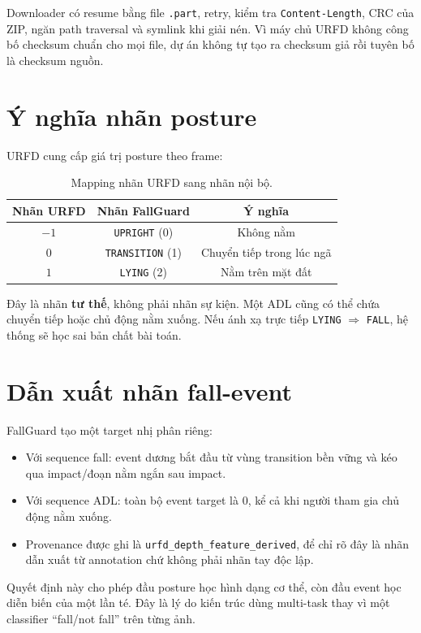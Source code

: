 \documentclass[12pt,a4paper,oneside]{report}
\newcommand{\code}[1]{\texttt{#1}}
\begin{document}
Downloader có resume bằng file \code{.part}, retry, kiểm tra
\code{Content-Length}, CRC của ZIP, ngăn path traversal và symlink khi giải nén.
Vì máy chủ URFD không công bố checksum chuẩn cho mọi file, dự án không tự tạo
ra checksum giả rồi tuyên bố là checksum nguồn.

\section{Ý nghĩa nhãn posture}

URFD cung cấp giá trị posture theo frame:

\begin{table}[H]
\centering
\caption{Mapping nhãn URFD sang nhãn nội bộ.}
\begin{tabular}{ccc}
\toprule
Nhãn URFD & Nhãn FallGuard & Ý nghĩa \\
\midrule
$-1$ & \code{UPRIGHT} (0) & Không nằm \\
$0$ & \code{TRANSITION} (1) & Chuyển tiếp trong lúc ngã \\
$1$ & \code{LYING} (2) & Nằm trên mặt đất \\
\bottomrule
\end{tabular}
\end{table}

Đây là nhãn \textbf{tư thế}, không phải nhãn sự kiện. Một ADL cũng có thể chứa
chuyển tiếp hoặc chủ động nằm xuống. Nếu ánh xạ trực tiếp
\code{LYING} $\Rightarrow$ \code{FALL}, hệ thống sẽ học sai bản chất bài toán.

\section{Dẫn xuất nhãn fall-event}

FallGuard tạo một target nhị phân riêng:

\begin{itemize}
  \item Với sequence fall: event dương bắt đầu từ vùng transition bền vững và
  kéo qua impact/đoạn nằm ngắn sau impact.
  \item Với sequence ADL: toàn bộ event target là 0, kể cả khi người tham gia
  chủ động nằm xuống.
  \item Provenance được ghi là \code{urfd\_depth\_feature\_derived}, để chỉ rõ
  đây là nhãn dẫn xuất từ annotation chứ không phải nhãn tay độc lập.
\end{itemize}

Quyết định này cho phép đầu posture học hình dạng cơ thể, còn đầu event học diễn
biến của một lần té. Đây là lý do kiến trúc dùng multi-task thay vì một classifier
``fall/not fall'' trên từng ảnh.
\end{document}
